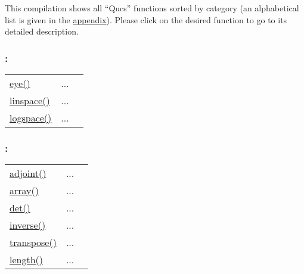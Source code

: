 
This compilation shows all {}``Qucs'' functions sorted by category (an alphabetical list is given in the \hyperlink{chapter:appendix}{appendix}). 
Please click on the desired function to go to its detailed description.




\subsubsection*{: }

\textcolor{blue}{}\begin{tabular}{>{\raggedleft}p{3cm}>{\centering}p{0.5cm}l}
\textcolor{blue}{\hyperlink{eye}{eye()}}&
...&
 \begin{NoHyper} \nameref{par:identity} \end{NoHyper}\tabularnewline
\textcolor{blue}{\hyperlink{linspace}{linspace()}}&
...&
 \begin{NoHyper} \nameref{par:linspace} \end{NoHyper}\tabularnewline
\textcolor{blue}{\hyperlink{logspace}{logspace()}}&
...&
 \begin{NoHyper} \nameref{par:logspace} \end{NoHyper}\tabularnewline
\end{tabular}


\subsubsection*{: }

\textcolor{blue}{}\begin{tabular}{>{\raggedleft}p{3cm}>{\centering}p{0.5cm}l}
\textcolor{blue}{\hyperlink{adjoint}{adjoint()}}&
...&
 \begin{NoHyper} \nameref{par:Adjoint-matrix.} \end{NoHyper}\tabularnewline
\textcolor{blue}{\hyperlink{array}{array()}}&
...&
 \begin{NoHyper} \nameref{par:array} \end{NoHyper}\tabularnewline
\textcolor{blue}{\hyperlink{det}{det()}}&
...&
 \begin{NoHyper} \nameref{par:Determinant} \end{NoHyper}\tabularnewline
\textcolor{blue}{\hyperlink{inverse}{inverse()}}&
...&
 \begin{NoHyper} \nameref{par:Matrix-inverse} \end{NoHyper}\tabularnewline
\textcolor{blue}{\hyperlink{transpose}{transpose()}}&
...&
 \begin{NoHyper} \nameref{par:Matrix-transpose} \end{NoHyper}\tabularnewline
\textcolor{blue}{\hyperlink{length}{length()}}&
...&
 \begin{NoHyper} \nameref{par:Vector-length} \end{NoHyper}\tabularnewline
\end{tabular}


